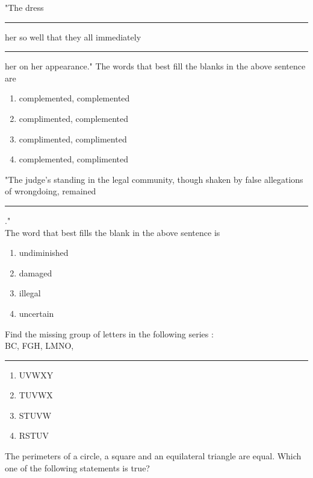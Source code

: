 \iffalse
\chapter{2018}
\author{EE24BTECH11011}
\section{ae}
\fi

  
  \item  "The dress \rule{3cm}{0.15mm} her so well that they all immediately \rule{3cm}{0.15mm} her on her
appearance."
The words that best fill the blanks in the above sentence are
\begin{enumerate}
    \item complemented, complemented
    \item complimented, complemented
    \item  complimented, complimented
    \item complemented, complimented
\end{enumerate}
\item "The judge's standing in the legal community, though shaken by false allegations of
wrongdoing, remained \rule{3cm}{0.15mm}."\\
The word that best fills the blank in the above sentence is
\begin{multicols}{4}
\begin{enumerate}
    \item  undiminished \item  damaged \item  illegal \item  uncertain
\end{enumerate}
\end{multicols}
\item Find the missing group of letters in the following series :\\
BC, FGH, LMNO, \rule{3cm}{0.15mm}
\begin{multicols}{4}
    \begin{enumerate}
        \item  UVWXY \item  TUVWX \item  STUVW \item  RSTUV
    \end{enumerate}
\end{multicols}
\item The perimeters of a circle, a square and an equilateral triangle are equal. Which one of the
following statements is true?
